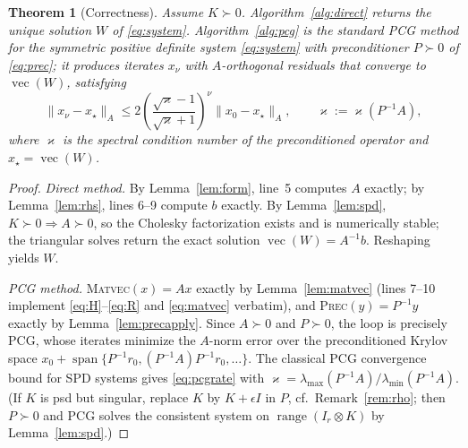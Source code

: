 \documentclass[12pt]{article}
\DeclareMathOperator{\vecop}{vec}
\newtheorem{theorem}{Theorem}
\theoremstyle{remark}
\begin{document}
\begin{theorem}[Correctness]\label{thm:correct}
Assume $K\succ0$. Algorithm~\ref{alg:direct} returns the unique solution $W$ of \eqref{eq:system}. Algorithm~\ref{alg:pcg} is the standard PCG method for the symmetric positive definite system \eqref{eq:system} with preconditioner $P\succ0$ of \eqref{eq:prec}; it produces iterates $x_\nu$ with $A$-orthogonal residuals that converge to $\vecop(W)$, satisfying
\begin{equation}\label{eq:pcgrate}
  \|x_\nu - x_\star\|_A \le 2\left(\frac{\sqrt{\varkappa}-1}{\sqrt{\varkappa}+1}\right)^{\!\nu}\|x_0-x_\star\|_A,
  \qquad \varkappa := \varkappa(P^{-1}A),
\end{equation}
where $\varkappa$ is the spectral condition number of the preconditioned operator and $x_\star=\vecop(W)$.
\end{theorem}

\begin{proof}
\emph{Direct method.} By Lemma~\ref{lem:form}, line~5 computes $A$ exactly; by Lemma~\ref{lem:rhs}, lines 6--9 compute $b$ exactly. By Lemma~\ref{lem:spd}, $K\succ0\Rightarrow A\succ0$, so the Cholesky factorization exists and is numerically stable; the triangular solves return the exact solution $\vecop(W)=A^{-1}b$. Reshaping yields $W$.

\emph{PCG method.} \textsc{Matvec}$(x)=Ax$ exactly by Lemma~\ref{lem:matvec} (lines 7--10 implement \eqref{eq:H}--\eqref{eq:R} and \eqref{eq:matvec} verbatim), and \textsc{Prec}$(y)=P^{-1}y$ exactly by Lemma~\ref{lem:precapply}. Since $A\succ0$ and $P\succ0$, the loop is precisely PCG, whose iterates minimize the $A$-norm error over the preconditioned Krylov space $x_0+\operatorname{span}\{P^{-1}r_0,(P^{-1}A)P^{-1}r_0,\dots\}$. The classical PCG convergence bound for SPD systems gives \eqref{eq:pcgrate} with $\varkappa=\lambda_{\max}(P^{-1}A)/\lambda_{\min}(P^{-1}A)$. (If $K$ is psd but singular, replace $K$ by $K+\epsilon I$ in $P$, cf.\ Remark~\ref{rem:rho}; then $P\succ0$ and PCG solves the consistent system on $\operatorname{range}(I_r\otimes K)$ by Lemma~\ref{lem:spd}.)
\end{proof}
\end{document}
